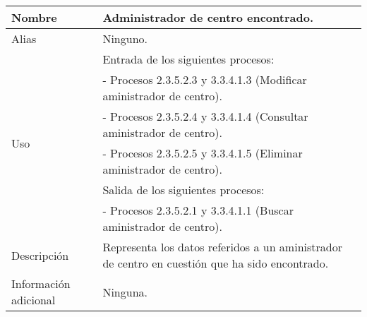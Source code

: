 \begin{center}
  \begin{tabular}{| l | p{9cm} |}
    \hline
    Nombre & \textbf{Administrador de centro encontrado}.\\
    \hline
    Alias & Ninguno.\\
    \hline
    \multirow{6}{*}{Uso} & Entrada de los siguientes procesos:\\
                         & - Procesos 2.3.5.2.3 y 3.3.4.1.3 (Modificar aministrador de centro).\\
                         & - Procesos 2.3.5.2.4 y 3.3.4.1.4 (Consultar aministrador de centro).\\
                         & - Procesos 2.3.5.2.5 y 3.3.4.1.5 (Eliminar aministrador de centro).\\
                         & Salida de los siguientes procesos:\\
                         & - Procesos 2.3.5.2.1 y 3.3.4.1.1 (Buscar aministrador de centro).\\
    \hline
    Descripción & Representa los datos referidos a un aministrador de centro
                  en cuestión que ha sido encontrado.\\
    \hline
    Información adicional & Ninguna.\\
    \hline
  \end{tabular}
\end{center}
